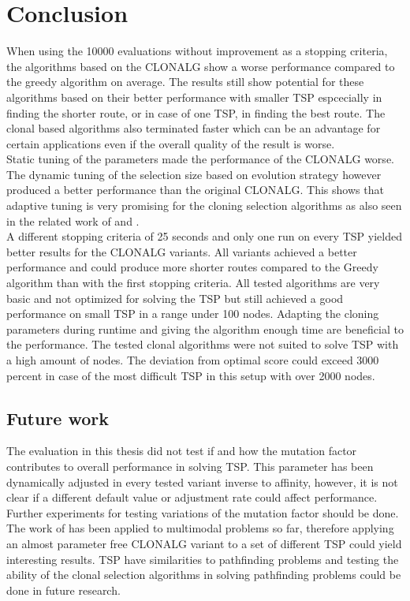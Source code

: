 \chapter{Conclusion}
\label{chap:con}
When using the 10000 evaluations without improvement as a stopping criteria, the algorithms based on the CLONALG show a worse performance compared to the greedy algorithm on average. The results still show potential for these algorithms based on their better performance with smaller TSP espcecially in finding the shorter route, or in case of one TSP, in finding the best route. The clonal based algorithms also terminated faster which can be an advantage for certain applications even if the overall quality of the result is worse.\\
Static tuning of the parameters made the performance of the CLONALG worse. The dynamic tuning of the selection size based on evolution strategy however produced a better performance than the original CLONALG. This shows that adaptive tuning is very promising for the cloning selection algorithms as also seen in the related work of \cite{Garret04} and \Cite{RIFF09}.\\
A different stopping criteria of 25 seconds and only one run on every TSP yielded better results for the CLONALG variants. All variants achieved a better performance and could produce more shorter routes compared to the Greedy algorithm than with the first stopping criteria. All tested algorithms are very basic and not optimized for solving the TSP but still achieved a good performance on small TSP in a range under 100 nodes. Adapting the cloning parameters during runtime and giving the algorithm enough time are beneficial to the performance. The tested clonal algorithms were not suited to solve TSP with a high amount of nodes. The deviation from optimal score could exceed 3000 percent in case of the most difficult TSP in this setup with over 2000 nodes.
\newpage 
\section{Future work}
The evaluation in this thesis did not test if and how the mutation factor contributes to overall performance in solving TSP. This parameter has been dynamically adjusted in every tested variant inverse to affinity, however, it is not clear if a different default value or adjustment rate could affect performance. Further experiments for testing variations of the mutation factor should be done. The work of \cite{Garret04} has been applied to multimodal problems so far, therefore applying an almost parameter free CLONALG variant to a set of different TSP could yield interesting results. TSP have similarities to pathfinding problems and testing the ability of the clonal selection algorithms in solving pathfinding problems could be done in future research.
